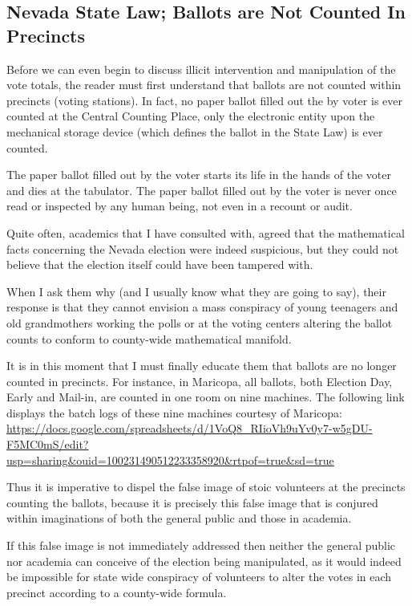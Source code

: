 \subsection{Nevada State Law; Ballots are Not Counted In Precincts}
Before we can even begin to discuss illicit intervention and manipulation of the vote totals, the reader must first understand that ballots are not counted within precincts (voting stations). In fact, no paper ballot filled out the by voter is ever counted at the Central Counting Place, only the electronic entity upon the mechanical storage device (which defines the ballot in the State Law) is ever counted. 

The paper ballot filled out by the voter starts its life in the hands of the voter and dies at the tabulator. The paper ballot filled out by the voter is never once read or inspected by any human being, not even in a recount or audit.

Quite often, academics that I have consulted with, agreed that the mathematical facts concerning the Nevada election were indeed suspicious, but they could not believe that the election itself could have been tampered with.

When I ask them why (and I usually know what they are going to say), their response is that they cannot envision a mass conspiracy of young teenagers and old grandmothers working the polls or at the voting centers altering the ballot counts to conform to county-wide mathematical manifold.

It is in this moment that I must finally educate them that ballots are no longer counted in precincts. For instance, in Maricopa, all ballots, both Election Day, Early and Mail-in, are counted in one room on nine machines. The following link displays the batch logs of these nine machines courtesy of Maricopa: \url{https://docs.google.com/spreadsheets/d/1VoQ8_RIioVh9uYv0y7-w5gDU-F5MC0mS/edit?usp=sharing&ouid=100231490512233358920&rtpof=true&sd=true}

Thus it is imperative to dispel the false image of stoic volunteers at the precincts counting the ballots, because it is precisely this false image that is conjured within imaginations of both the general public and those in academia.

If this false image is not immediately addressed then neither the general public nor academia can conceive of the election being manipulated, as it would indeed be impossible for state wide conspiracy of volunteers to alter the votes in each precinct according to a county-wide formula.

